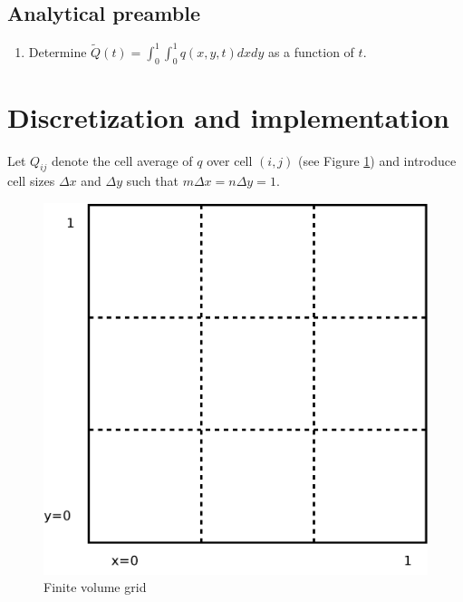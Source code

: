\documentclass[11pt, a4paper]{article}
\newcommand{\dx}{\Delta x}
\newcommand{\dy}{\Delta y}
\begin{document}
\subsection{Analytical preamble} \label{sub:ap}
\begin{enumerate}
\item Determine $\tilde{Q}(t) = \int_0^1 \int_0^1 q(x,y,t) dx dy$ as a
  function of $t$.
\end{enumerate}
\section{Discretization and implementation}
Let $Q_{ij}$ denote the cell average of $q$ over cell $(i,j)$ (see
Figure \ref{fig:fv_grid}) and introduce cell sizes $\dx$ and $\dy$
such that $m\dx = n\dy = 1$.
\begin{figure}
  \centering
  \includegraphics[scale=0.4]{fig/grid1}
  \caption{Finite volume grid}
  \label{fig:fv_grid}
\end{figure}
\end{document}
